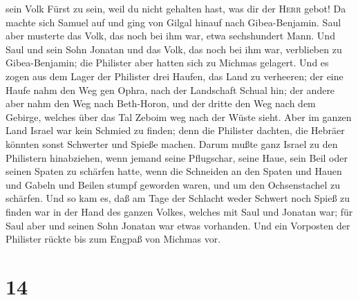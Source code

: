 sein Volk Fürst zu sein, weil du nicht gehalten hast, was dir der
\textsc{Herr} gebot!  Da machte sich Samuel auf und ging
von Gilgal hinauf nach Gibea-Benjamin. Saul aber musterte das Volk, das
noch bei ihm war, etwa sechshundert Mann.  Und Saul und
sein Sohn Jonatan und das Volk, das noch bei ihm war, verblieben zu
Gibea-Benjamin; die Philister aber hatten sich zu Michmas gelagert.
 Und es zogen aus dem Lager der Philister drei Haufen,
das Land zu verheeren; der eine Haufe nahm den Weg gen Ophra, nach der
Landschaft Schual hin;  der andere aber nahm den Weg nach
Beth-Horon, und der dritte den Weg nach dem Gebirge, welches über das
Tal Zeboim weg nach der Wüste sieht.  Aber im ganzen Land
Israel war kein Schmied zu finden; denn die Philister dachten, die
Hebräer könnten sonst Schwerter und Spieße machen.  Darum
mußte ganz Israel zu den Philistern hinabziehen, wenn jemand seine
Pflugschar, seine Haue, sein Beil oder seinen Spaten zu schärfen hatte,
 wenn die Schneiden an den Spaten und Hauen und Gabeln
und Beilen stumpf geworden waren, und um den Ochsenstachel zu schärfen.
 Und so kam es, daß am Tage der Schlacht weder Schwert
noch Spieß zu finden war in der Hand des ganzen Volkes, welches mit Saul
und Jonatan war; für Saul aber und seinen Sohn Jonatan war etwas
vorhanden.  Und ein Vorposten der Philister rückte bis
zum Engpaß von Michmas vor.

\hypertarget{section-13}{%
\section{14}\label{section-13}}

